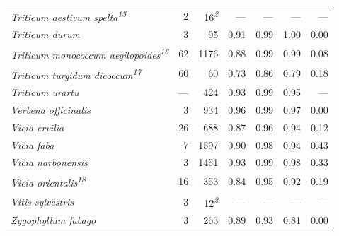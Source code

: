 \documentclass[
  authoryear,
  preprint]{elsarticle}
\begin{document}
\begin{longtable}{@{\extracolsep{\fill}}lrrrrrr}
{\itshape Triticum aestivum spelta}\textsuperscript{\textit{15}} & 2 & 16\textsuperscript{\textit{2}} & — & — & — & — \\ 
{\itshape Triticum durum} & 3 & 95 & 0.91 & 0.99 & 1.00 & 0.00 \\ 
{\itshape Triticum monococcum aegilopoides}\textsuperscript{\textit{16}} & 62 & 1176 & 0.88 & 0.99 & 0.99 & 0.08 \\ 
{\itshape Triticum turgidum dicoccum}\textsuperscript{\textit{17}} & 60 & 60 & 0.73 & 0.86 & 0.79 & 0.18 \\ 
{\itshape Triticum urartu} & — & 424 & 0.93 & 0.99 & 0.95 & — \\ 
{\itshape Verbena officinalis} & 3 & 934 & 0.96 & 0.99 & 0.97 & 0.00 \\ 
{\itshape Vicia ervilia} & 26 & 688 & 0.87 & 0.96 & 0.94 & 0.12 \\ 
{\itshape Vicia faba} & 7 & 1597 & 0.90 & 0.98 & 0.94 & 0.43 \\ 
{\itshape Vicia narbonensis} & 3 & 1451 & 0.93 & 0.99 & 0.98 & 0.33 \\ 
{\itshape Vicia orientalis}\textsuperscript{\textit{18}} & 16 & 353 & 0.84 & 0.95 & 0.92 & 0.19 \\ 
{\itshape Vitis sylvestris} & 3 & 12\textsuperscript{\textit{2}} & — & — & — & — \\ 
{\itshape Zygophyllum fabago} & 3 & 263 & 0.89 & 0.93 & 0.81 & 0.00 \\ 
\bottomrule

\end{longtable}
\end{document}
